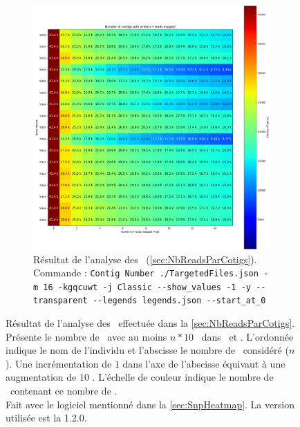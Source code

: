 \documentclass[../main]{subfiles} %
\begin{document}
\begin{landscape}
\begin{figure}[p]
\begin{subfigure}[b]{0.55\paperwidth}
        \includegraphics[width=\textwidth]{../Illustrations/Mo_Analysis_Contig_Heatmap_global.png}
        \caption{Résultat de l'analyse des \BamTrMo (\ref{sec:NbReadsParCotigs}).\\
        Commande : \lstinline{Contig Number ./TargetedFiles.json -m 16 -kgqcuwt -j Classic --show_values -1 -y --transparent --legends legends.json --start_at_0}  
        }
        \label{fig:ContigsMoClassic}
    \end{subfigure}
    
      \caption{Résultat de l'analyse des \bam effectuée dans la \ref{sec:NbReadsParCotigs}. Présente le nombre de \contigs avec au moins $n * 10$ \reads dans \BamTrEx et \BamTrMo. L'ordonnée indique le nom de l'individu et l'abscisse le nombre de \reads considéré ($n$). Une incrémentation de $1$ dans l'axe de l'abscisse équivaut à une augmentation de $10$ \reads. L'échelle de couleur indique le nombre de \contigs contenant ce nombre de \reads. \\ Fait avec le logiciel mentionné dans la \ref{sec:SnpHeatmap}. La version utilisée est la 1.2.0.}
    \label{fig:ContigClassicHeatmap}
    
\end{figure}
\end{landscape}
\restoregeometry
\end{document}
